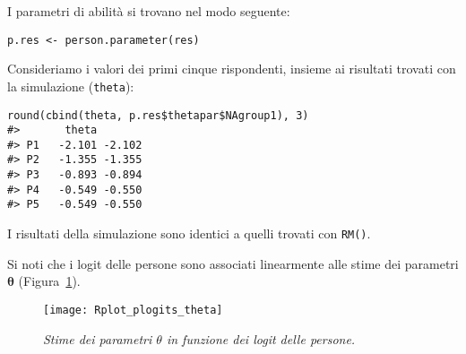 I parametri di abilità si trovano nel modo seguente: 
\begin{lstlisting}
p.res <- person.parameter(res)
\end{lstlisting} 
Consideriamo i valori dei primi cinque rispondenti, insieme ai risultati trovati con la simulazione ({\tt theta}):
\begin{lstlisting}
round(cbind(theta, p.res$thetapar$NAgroup1), 3)
#>       theta       
#> P1   -2.101 -2.102
#> P2   -1.355 -1.355
#> P3   -0.893 -0.894
#> P4   -0.549 -0.550
#> P5   -0.549 -0.550
\end{lstlisting} 
I risultati della simulazione sono identici a quelli trovati con {\tt RM()}. 

Si noti che i logit delle persone sono associati linearmente alle stime dei parametri $\boldsymbol{\theta}$ (Figura~\ref{fig:plogit_theta}). 
\begin{figure}[tb]
  \centering
    \texttt{[image: Rplot\_plogits\_theta]}
    \caption{{\it Stime dei parametri $\theta$ in funzione dei logit delle persone.}}
    \label{fig:plogit_theta}
\end{figure}





